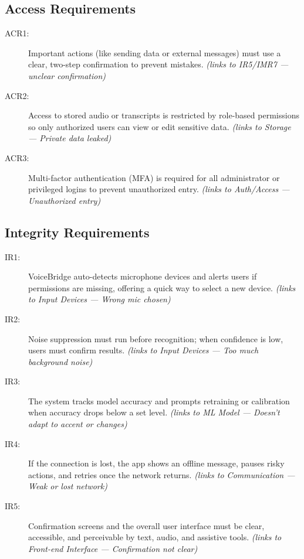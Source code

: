 \documentclass[11pt]{article}
\begin{document}
\subsection{Access Requirements}\label{req:SEC1}

\begin{description}
  \item[ACR1:] Important actions (like sending data or external messages) must use a clear, two-step confirmation to prevent mistakes. \emph{(links to IR5/IMR7 — unclear confirmation)}
  \item[ACR2:] Access to stored audio or transcripts is restricted by role-based permissions so only authorized users can view or edit sensitive data. \emph{(links to Storage — Private data leaked)}
  \item[ACR3:] Multi-factor authentication (MFA) is required for all administrator or privileged logins to prevent unauthorized entry. \emph{(links to Auth/Access — Unauthorized entry)}
\end{description}

\subsection{Integrity Requirements}\label{req:SEC2}

\begin{description}
  \item[IR1:] VoiceBridge auto-detects microphone devices and alerts users if permissions are missing, offering a quick way to select a new device. \emph{(links to Input Devices — Wrong mic chosen)}
  \item[IR2:] Noise suppression must run before recognition; when confidence is low, users must confirm results. \emph{(links to Input Devices — Too much background noise)}
  \item[IR3:] The system tracks model accuracy and prompts retraining or calibration when accuracy drops below a set level. \emph{(links to ML Model — Doesn’t adapt to accent or changes)}
  \item[IR4:] If the connection is lost, the app shows an offline message, pauses risky actions, and retries once the network returns. \emph{(links to Communication — Weak or lost network)}
  \item[IR5:] Confirmation screens and the overall user interface must be clear, accessible, and perceivable by text, audio, and assistive tools. \emph{(links to Front-end Interface — Confirmation not clear)}
\end{description}
\end{document}
